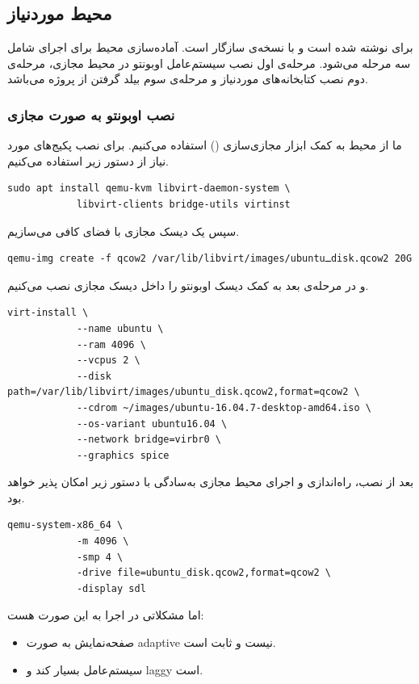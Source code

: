 \documentclass[11pt, a4paper]{article}
\begin{document}
	\subsection{محیط موردنیاز}
	 برای 
	 نوشته شده است
	و با نسخه‌ی
	 سازگار است.
	آماده‌سازی محیط برای اجرای 
	  شامل سه مرحله می‌شود. مرحله‌ی اول 
	نصب سیستم‌عامل اوبونتو در محیط مجازی، مرحله‌ی دوم نصب کتابخانه‌های موردنیاز و مرحله‌ی سوم بیلد گرفتن از پروژه می‌باشد.
	
	\subsubsection{نصب اوبونتو به صورت مجازی}
	ما از محیط 
	 به کمک ابزار مجازی‌سازی
	()
	 استفاده می‌کنیم.
	برای نصب پکیج‌های مورد نیاز از دستور زیر استفاده می‌کنیم.
	\begin{LTR}
		\begin{verbatim}sudo apt install qemu-kvm libvirt-daemon-system \
			libvirt-clients bridge-utils virtinst\end{verbatim}
	\end{LTR}
	سپس یک دیسک مجازی با فضای کافی می‌سازیم.
	\begin{LTR}
		\begin{verbatim}qemu-img create -f qcow2 /var/lib/libvirt/images/ubuntuـdisk.qcow2 20G\end{verbatim}
	\end{LTR}
	و در مرحله‌ی بعد به کمک 
	دیسک اوبونتو را داخل دیسک مجازی نصب می‌کنیم.
	
	\begin{LTR}
		\begin{verbatim}virt-install \
			--name ubuntu \
			--ram 4096 \
			--vcpus 2 \
			--disk path=/var/lib/libvirt/images/ubuntu_disk.qcow2,format=qcow2 \
			--cdrom ~/images/ubuntu-16.04.7-desktop-amd64.iso \
			--os-variant ubuntu16.04 \
			--network bridge=virbr0 \
			--graphics spice\end{verbatim}
	\end{LTR}
	
	بعد از نصب، راه‌اندازی و اجرای محیط مجازی به‌سادگی با دستور زیر امکان پذیر خواهد بود.
	
	\begin{LTR}
		\begin{verbatim}qemu-system-x86_64 \
			-m 4096 \
			-smp 4 \
			-drive file=ubuntu_disk.qcow2,format=qcow2 \
			-display sdl\end{verbatim}
	\end{LTR}
	اما مشکلاتی در اجرا به این صورت هست:
	\begin{itemize}
		\item صفحه‌نمایش به صورت adaptive نیست و ثابت است.
		\item سیستم‌عامل بسیار کند و laggy است.
	\end{itemize}
	
\end{document}
